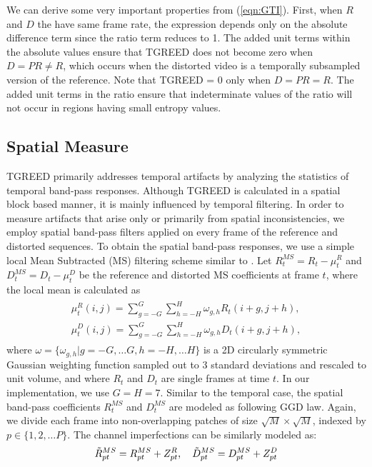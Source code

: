 \documentclass[journal]{IEEEtran}
\begin{document}
We can derive some very important properties from (\ref{eqn:GTI}). First, when $R$ and $D$ the have same frame rate, the expression depends only on the absolute difference term since the ratio term reduces to 1. The added unit terms within the absolute values ensure that TGREED does not become zero when $D = PR \neq R$, which occurs when the distorted video is a temporally subsampled version of the reference. Note that TGREED = 0 only when $D = PR = R$. The added unit terms in the ratio ensure that indeterminate values of the ratio will not occur in regions having small entropy values.

\subsection{Spatial Measure}
TGREED primarily addresses temporal artifacts by analyzing the statistics of temporal band-pass responses. Although TGREED is calculated in a spatial block based manner, it is mainly influenced by temporal filtering. In order to measure artifacts that arise only or primarily from spatial inconsistencies, we employ spatial band-pass filters applied on every frame of the reference and distorted sequences. To obtain the spatial band-pass responses, we use a simple local Mean Subtracted (MS) filtering scheme similar to \cite{bampis2017speed}. Let $R_t ^{MS} = R_t - \mu_t ^R$ and $D_t ^{MS} = D_t - \mu_t ^D$ be the reference and distorted MS coefficients at frame $t$, where the local mean is calculated as
\begin{align}
\begin{aligned}
    \mu_t ^R(i,j) = \sum_{g=-G} ^G \sum_{h=-H} ^H \omega_{g,h} R_t(i+g,j+h), \\ \mu_t ^D(i,j) = \sum_{g=-G} ^G \sum_{h=-H} ^H \omega_{g,h} D_t(i+g,j+h),
\end{aligned}
\end{align}
where $\omega = \{\omega_{g,h}|g = -G,\ldots G, h = -H,\ldots H\}$ is a 2D circularly symmetric Gaussian weighting function sampled out to 3 standard deviations and rescaled to unit volume, and where $R_t$ and $D_t$ are single frames at time $t$. In our implementation, we use $G = H = 7$. Similar to the temporal case, the spatial band-pass coefficients $R_t ^{MS}$ and $D_t ^{MS}$ are modeled as following GGD law. Again, we divide each frame into non-overlapping patches of size $\sqrt{M} \times \sqrt{M}$, indexed by $p \in \{ 1,2, \ldots P \}$. The channel imperfections can be similarly modeled as:
\begin{align}
    \Tilde{R}_{pt} ^{MS} = R_{pt}^{MS} + Z_{pt}^R, \quad \Tilde{D}_{pt}^{MS} = D_{pt}^{MS} + Z_{pt}^D
    \label{eqn:neural_noise_spatial}
\end{align}
\end{document}
